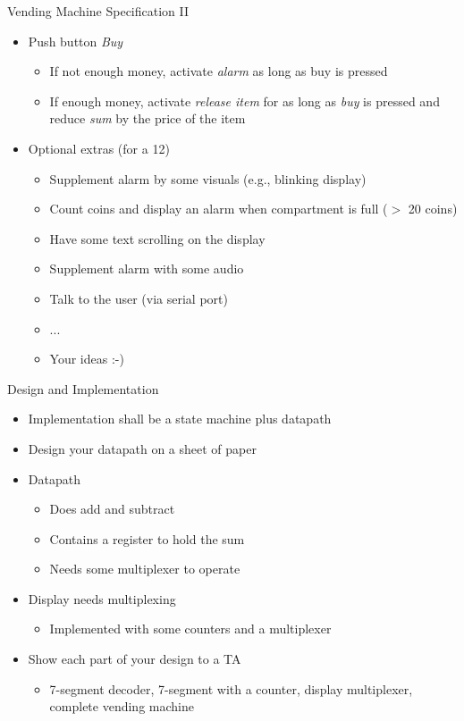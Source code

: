 \begin{frame}[fragile]{Vending Machine Specification II}
\begin{itemize}
\item Push button \emph{Buy}
\begin{itemize}
\item If not enough money, activate \emph{alarm} as long as buy is pressed
\item If enough money, activate \emph{release item} for as long as \emph{buy}
is pressed and reduce \emph{sum} by the price of the item
\end{itemize}
\item Optional extras (for a 12)
\begin{itemize}
\item Supplement alarm by some visuals (e.g., blinking display)
\item Count coins and display an alarm when compartment is full ($>$ 20 coins)
\item Have some text scrolling on the display
\item Supplement alarm with some audio
\item Talk to the user (via serial port)
\item ...
\item Your ideas :-)
\end{itemize}
\end{itemize}
\end{frame}

\begin{frame}[fragile]{Design and Implementation}
\begin{itemize}
\item Implementation shall be a state machine plus datapath
\item Design your datapath on a sheet of paper
\item Datapath
\begin{itemize}
\item Does add and subtract
\item Contains a register to hold the sum
\item Needs some multiplexer to operate
\end{itemize}
\item Display needs multiplexing
\begin{itemize}
\item Implemented with some counters and a multiplexer
\end{itemize}
\item Show each part of your design to a TA
\begin{itemize}
\item 7-segment decoder, 7-segment with a counter, display multiplexer, complete vending machine
\end{itemize}
\end{itemize}
\end{frame}

